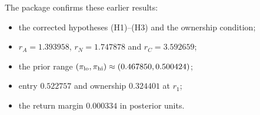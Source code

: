 \documentclass[11pt]{article}
\theoremstyle{definition}
\begin{document}
The package confirms these earlier results:
\begin{itemize}
\item the corrected hypotheses (H1)--(H3) and the ownership condition;
\item $r_A=1.393958$, $r_N=1.747878$ and $r_C=3.592659$;
\item the prior range $(\pi_{\rm lo},\pi_{\rm hi})\approx(0.467850,0.500424)$;
\item entry $0.522757$ and ownership $0.324401$ at $r_1$;
\item the return margin $0.000334$ in posterior units.
\end{itemize}
\end{document}

